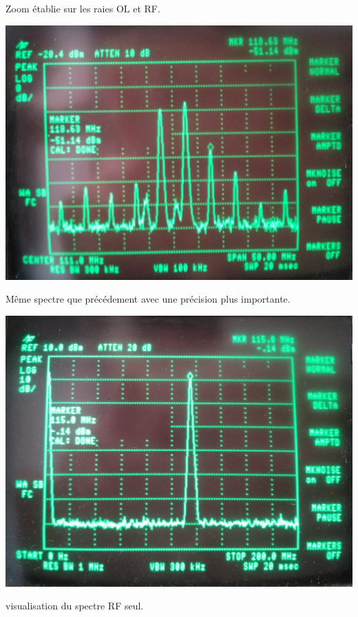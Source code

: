 \documentclass[a4paper,12pt]{report}            %
\begin{document}
    Zoom établie sur les raies OL et RF.
\begin{center}\includegraphics[scale = 0.12]{pic/photo4.jpg}\\ \end{center}
    Même spectre que précédement avec une précision plus importante.
\begin{center}\includegraphics[scale = 0.11]{pic/photo1.jpg}\\ \end{center}
    visualisation du spectre RF seul.
\end{document}
